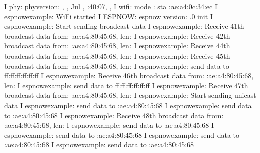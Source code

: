 \documentclass[a4paper,12pt,english]{sphinxmanual}
\begin{document}
{{\begin{sphinxVerbatim}[commandchars=\\\{\}]
I  phy: phy\PYGZus{}version: , , Jul  , :40:07, , 
I  wifi: mode : sta :ae:a4:0c:34:ec
I  espnow\PYGZus{}example: WiFi started
I  ESPNOW: espnow \PYG{o}{[}version: .0\PYG{o}{]} init
I  espnow\PYGZus{}example: Start sending broadcast data
I  espnow\PYGZus{}example: Receive 41th broadcast data from: :ae:a4:80:45:68, len: 
I  espnow\PYGZus{}example: Receive 42th broadcast data from: :ae:a4:80:45:68, len: 
I  espnow\PYGZus{}example: Receive 44th broadcast data from: :ae:a4:80:45:68, len: 
I  espnow\PYGZus{}example: Receive 45th broadcast data from: :ae:a4:80:45:68, len: 
I  espnow\PYGZus{}example: send data to ff:ff:ff:ff:ff:ff
I  espnow\PYGZus{}example: Receive 46th broadcast data from: :ae:a4:80:45:68, len: 
I  espnow\PYGZus{}example: send data to ff:ff:ff:ff:ff:ff
I  espnow\PYGZus{}example: Receive 47th broadcast data from: :ae:a4:80:45:68, len: 
I  espnow\PYGZus{}example: Start sending unicast data
I  espnow\PYGZus{}example: send data to :ae:a4:80:45:68
I  espnow\PYGZus{}example: send data to :ae:a4:80:45:68
I  espnow\PYGZus{}example: Receive 48th broadcast data from: :ae:a4:80:45:68, len: 
I  espnow\PYGZus{}example: send data to :ae:a4:80:45:68
I  espnow\PYGZus{}example: send data to :ae:a4:80:45:68
I  espnow\PYGZus{}example: send data to :ae:a4:80:45:68
I  espnow\PYGZus{}example: send data to :ae:a4:80:45:68
\end{sphinxVerbatim}


}}
\end{document}
